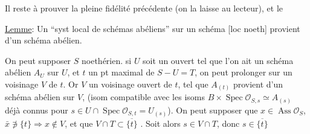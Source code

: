 Il reste à prouver la pleine fidélité précédente (on la laisse au lecteur), et le

\uline{Lemme}: Un ``syst local de schémas abéliens'' sur un schéma [loc noeth]  provient d'un schéma abélien.

On peut supposer $S$ noethérien.   si $U$  soit un ouvert tel que l'on ait un schéma abélien $A_U$ sur $U$, et $t$ un pt maximal de $S-U=T$, on peut prolonger sur un voisinage $V$ de $t$. Or  $V$ un voisinage ouvert de $t$, tel que $A_{(t)}$ provient d'un schéma abélien sur $V$,    (isom compatible avec les isoms $B\times\operatorname{Spec}\mathcal O_{S,s}\simeq A_{(s)}$ déjà connus pour $s\in U\cap\operatorname{Spec}\mathcal O_{S,t}=U_{(s)}$).  On peut supposer que $x\in\operatorname{Ass}\mathcal O_S$, $\bar x\not\ni\{t\}\Rightarrow x\notin V$, et que $V\cap T\subset\overline{\{t\}}$ . Soit alors $s\in V\cap T$, donc $s\in\overline{\{t\}}$

